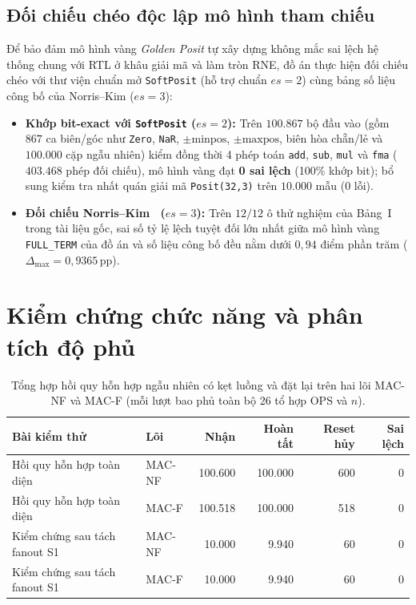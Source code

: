 \subsection{Đối chiếu chéo độc lập mô hình tham chiếu}
Để bảo đảm mô hình vàng \textit{Golden Posit} tự xây dựng không mắc sai lệch hệ
thống chung với RTL ở khâu giải mã và làm tròn RNE, đồ án thực hiện đối chiếu
chéo với thư viện chuẩn mở \texttt{SoftPosit} (hỗ trợ chuẩn $es=2$) cùng bảng số
liệu công bố của Norris--Kim ($es=3$):
\begin{itemize}
  \item \textbf{Khớp bit-exact với \texttt{SoftPosit} ($es=2$):} Trên $100.867$
        bộ đầu vào (gồm $867$ ca biên/góc như \texttt{Zero}, \texttt{NaR},
        $\pm\mathrm{minpos}$, $\pm\mathrm{maxpos}$, biên hòa chẵn/lẻ và $100.000$
        cặp ngẫu nhiên) kiểm đồng thời 4 phép toán \texttt{add}, \texttt{sub},
        \texttt{mul} và \texttt{fma} ($403.468$ phép đối chiếu), mô hình vàng
        đạt \textbf{0 sai lệch} (100\% khớp bit); bổ sung kiểm tra nhất quán
        giải mã \texttt{Posit(32,3)} trên $10.000$ mẫu ($0$ lỗi).
  \item \textbf{Đối chiếu Norris--Kim~\cite{norris2021iterativeposit} ($es=3$):}
        Trên $12/12$ ô thử nghiệm của Bảng~I trong tài liệu gốc, sai số tỷ lệ
        lệch tuyệt đối lớn nhất giữa mô hình vàng \texttt{FULL\_TERM} của đồ án
        và số liệu công bố đều nằm dưới $0{,}94$ điểm phần trăm
        ($\Delta_{\max} = 0{,}9365$\,pp).
\end{itemize}

\section{Kiểm chứng chức năng và phân tích độ phủ}
\begin{table}[htbp]
  \centering
  \caption{Tổng hợp hồi quy hỗn hợp ngẫu nhiên có kẹt luồng và đặt lại trên hai lõi MAC-NF và MAC-F (mỗi lượt bao phủ toàn bộ 26 tổ hợp OPS và $n$).}
  \label{tab:mixed}
  \begin{tabular}{llrrrr}
    \toprule
    Bài kiểm thử & Lõi & Nhận & Hoàn tất & Reset hủy & Sai lệch \\
    \midrule
    Hồi quy hỗn hợp toàn diện & MAC-NF & 100.600 & 100.000 & 600 & 0 \\
    Hồi quy hỗn hợp toàn diện & MAC-F  & 100.518 & 100.000 & 518 & 0 \\
    Kiểm chứng sau tách fanout S1 & MAC-NF & 10.000 & 9.940 & 60 & 0 \\
    Kiểm chứng sau tách fanout S1 & MAC-F  & 10.000 & 9.940 & 60 & 0 \\
    \bottomrule
  \end{tabular}
\end{table}

